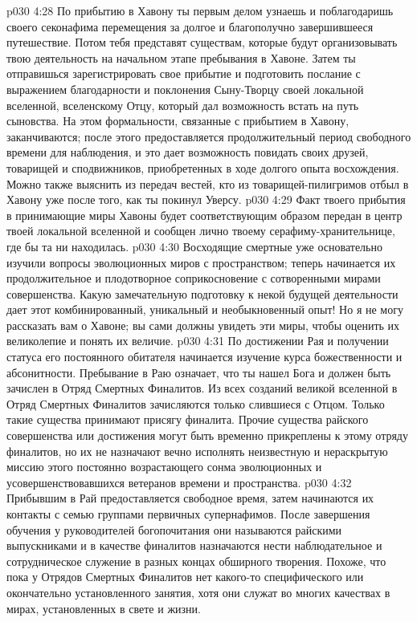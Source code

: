 \vs p030 4:28 По прибытию в Хавону ты первым делом узнаешь и поблагодаришь своего секонафима перемещения за долгое и благополучно завершившееся путешествие. Потом тебя представят существам, которые будут организовывать твою деятельность на начальном этапе пребывания в Хавоне. Затем ты отправишься зарегистрировать свое прибытие и подготовить послание с выражением благодарности и поклонения Сыну\hyp{}Творцу своей локальной вселенной, вселенскому Отцу, который дал возможность встать на путь сыновства. На этом формальности, связанные с прибытием в Хавону, заканчиваются; после этого предоставляется продолжительный период свободного времени для наблюдения, и это дает возможность повидать своих друзей, товарищей и сподвижников, приобретенных в ходе долгого опыта восхождения. Можно также выяснить из передач вестей, кто из товарищей\hyp{}пилигримов отбыл в Хавону уже после того, как ты покинул Уверсу.
\vs p030 4:29 Факт твоего прибытия в принимающие миры Хавоны будет соответствующим образом передан в центр твоей локальной вселенной и сообщен лично твоему серафиму\hyp{}хранительнице, где бы та ни находилась.
\vs p030 4:30 Восходящие смертные уже основательно изучили вопросы эволюционных миров с пространством; теперь начинается их продолжительное и плодотворное соприкосновение с сотворенными мирами совершенства. Какую замечательную подготовку к некой будущей деятельности дает этот комбинированный, уникальный и необыкновенный опыт! Но я не могу рассказать вам о Хавоне; вы сами должны увидеть эти миры, чтобы оценить их великолепие и понять их величие.
\vs p030 4:31 \bibnobreakspace {} По достижении Рая и получении статуса его постоянного обитателя начинается изучение курса божественности и абсонитности. Пребывание в Раю означает, что ты нашел Бога и должен быть зачислен в Отряд Смертных Финалитов. Из всех созданий великой вселенной в Отряд Смертных Финалитов зачисляются только слившиеся с Отцом. Только такие существа принимают присягу финалита. Прочие существа райского совершенства или достижения могут быть временно прикреплены к этому отряду финалитов, но их не назначают вечно исполнять неизвестную и нераскрытую миссию этого постоянно возрастающего сонма эволюционных и усовершенствовавшихся ветеранов времени и пространства.
\vs p030 4:32 Прибывшим в Рай предоставляется свободное время, затем начинаются их контакты с семью группами первичных супернафимов. После завершения обучения у руководителей богопочитания они называются райскими выпускниками и в качестве финалитов назначаются нести наблюдательное и сотрудническое служение в разных концах обширного творения. Похоже, что пока у Отрядов Смертных Финалитов нет какого\hyp{}то специфического или окончательно установленного занятия, хотя они служат во многих качествах в мирах, установленных в свете и жизни.
